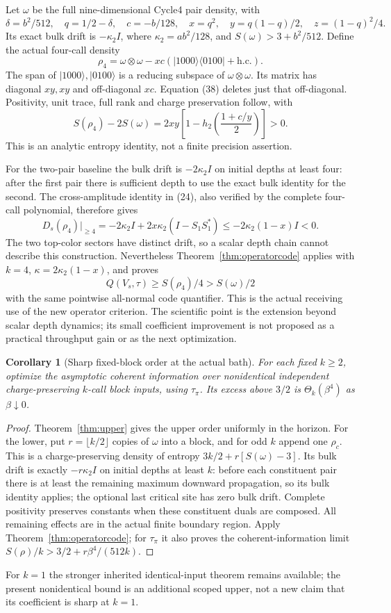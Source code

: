 \documentclass[11pt]{article}
\newtheorem{corollary}[theorem]{Corollary}
\begin{document}
Let $\omega$ be the full nine-dimensional Cycle4 pair density, with
\[
 \delta=b^2/512,\quad q=1/2-\delta,\quad c=-b/128,\quad
 x=q^2,\quad y=q(1-q)/2,\quad z=(1-q)^2/4.
 \tag{37}
\]
Its exact bulk drift is $-\kappa_2 I$, where
$\kappa_2=ab^2/128$, and $S(\omega)>3+b^2/512$.
Define the actual four-call density
\[
 \rho_4=\omega\otimes\omega
       -xc(|1000\rangle\langle0100|+\mathrm{h.c.}).
 \tag{38}
\]
The span of $|1000\rangle,|0100\rangle$ is a reducing subspace of
$\omega\otimes\omega$. Its matrix has diagonal $xy,xy$ and off-diagonal
$xc$. Equation (38) deletes just that off-diagonal. Positivity, unit trace,
full rank and charge preservation follow, with
\[
 S(\rho_4)-2S(\omega)
 =2xy\left[1-h_2\left(\frac{1+c/y}{2}\right)\right]>0.
 \tag{39}
\]
This is an analytic entropy identity, not a finite precision assertion.

For the two-pair baseline the bulk drift is $-2\kappa_2 I$ on initial
depths at least four: after the first pair there is sufficient depth to
use the exact bulk identity for the second. The cross-amplitude identity
in (24), also verified by the complete four-call polynomial, therefore gives
\[
 D_s(\rho_4)\big|_{\ge4}
 =-2\kappa_2 I+2x\kappa_2(I-S_1S_1^*)
 \le-2\kappa_2(1-x)I<0.
 \tag{40}
\]
The two top-color sectors have distinct drift, so a scalar depth chain
cannot describe this construction. Nevertheless Theorem~\ref{thm:operatorcode}
applies with $k=4$, $\kappa=2\kappa_2(1-x)$, and proves
\[
 Q(V_s,\tau)\ge S(\rho_4)/4>S(\omega)/2
 \tag{41}
\]
with the same pointwise all-normal code quantifier. This is the actual
receiving use of the new operator criterion. The scientific point is the
extension beyond scalar depth dynamics; its small coefficient improvement
is not proposed as a practical throughput gain or as the next optimization.

\begin{corollary}[Sharp fixed-block order at the actual bath]\label{cor:theta}
For each fixed $k\ge2$, optimize the asymptotic coherent information
over nonidentical independent charge-preserving $k$-call block inputs,
using $\tau_\pi$. Its excess above $3/2$ is $\Theta_k(\beta^4)$ as
$\beta\downarrow0$.
\end{corollary}
\begin{proof}
Theorem~\ref{thm:upper} gives the upper order uniformly in the horizon.
For the lower, put $r=\lfloor k/2\rfloor$ copies of $\omega$ into a
block, and for odd $k$ append one $\rho_c$. This is a charge-preserving
density of entropy $3k/2+r[S(\omega)-3]$.
Its bulk drift is exactly $-r\kappa_2 I$ on initial depths at least $k$:
before each constituent pair there is at least the remaining maximum
downward propagation, so its bulk identity applies; the optional last
critical site has zero bulk drift. Complete positivity preserves constants
when these constituent duals are composed. All remaining effects are in
the actual finite boundary region. Apply Theorem~\ref{thm:operatorcode};
for $\tau_\pi$ it also proves the coherent-information limit
$S(\rho)/k>3/2+r\beta^4/(512k)$.
\end{proof}
For $k=1$ the stronger inherited identical-input theorem remains available;
the present nonidentical bound is an additional scoped upper, not a new
claim that its coefficient is sharp at $k=1$.
\end{document}
